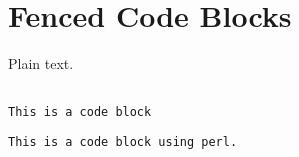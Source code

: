 
\def\mytitle{MultiMarkdown Fenced Code Blocks Test}
\def\latexmode{memoir}


\chapter{Fenced Code Blocks}
\label{fencedcodeblocks}

Plain text.

\begin{adjustwidth}{2.5em}{2.5em}
\begin{verbatim}

This is a code block

\end{verbatim}
\end{adjustwidth}

\begin{adjustwidth}{2.5em}{2.5em}
\begin{lstlisting}[language=perl]
This is a code block using perl.

\end{lstlisting}
\end{adjustwidth}




